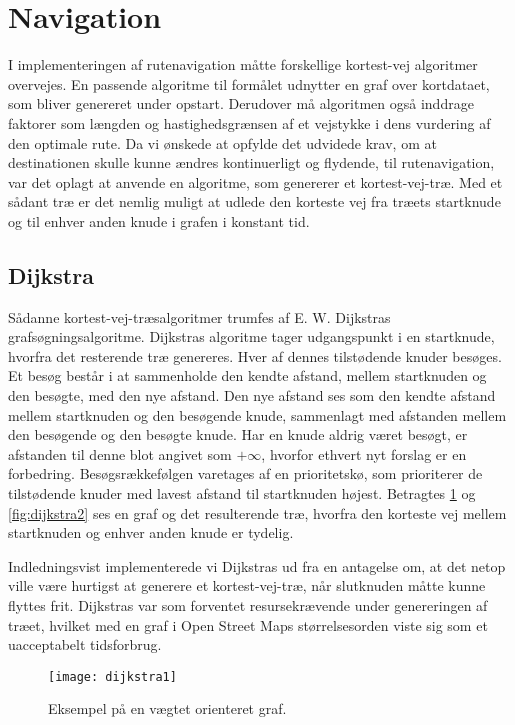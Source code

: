 \section{Navigation}
\label{sec:navigation}
I implementeringen af rutenavigation måtte forskellige kortest-vej algoritmer overvejes. En passende algoritme til formålet udnytter en graf over kortdataet, som bliver genereret under opstart. Derudover må algoritmen også inddrage faktorer som længden og hastighedsgrænsen af et vejstykke i dens vurdering af den optimale rute. Da vi ønskede at opfylde det udvidede krav, om at destinationen skulle kunne ændres kontinuerligt og flydende, til rutenavigation, var det oplagt at anvende en algoritme, som genererer et kortest-vej-træ. Med et sådant træ er det nemlig muligt at udlede den korteste vej fra træets startknude og til enhver anden knude i grafen i konstant tid.

\subsection{Dijkstra}
\label{subsec:dijkstra}
Sådanne kortest-vej-træsalgoritmer trumfes af E. W. Dijkstras grafsøgningsalgoritme. Dijkstras algoritme tager udgangspunkt i en startknude, hvorfra det resterende træ genereres. Hver af dennes tilstødende knuder besøges. Et besøg består i at sammenholde den kendte afstand, mellem startknuden og den besøgte, med den nye afstand. Den nye afstand ses som den kendte afstand mellem startknuden og den besøgende knude, sammenlagt med afstanden mellem den besøgende og den besøgte knude. Har en knude aldrig været besøgt, er afstanden til denne blot angivet som $+\infty$, hvorfor ethvert nyt forslag er en forbedring. Besøgsrækkefølgen varetages af en prioritetskø, som prioriterer de tilstødende knuder med lavest afstand til startknuden højest. Betragtes \ref{fig:dijkstra1} og \ref{fig:dijkstra2} ses en graf og det resulterende træ, hvorfra den korteste vej mellem startknuden og enhver anden knude er tydelig.

Indledningsvist implementerede vi Dijkstras ud fra en antagelse om, at det netop ville være hurtigst at generere et kortest-vej-træ, når slutknuden måtte kunne flyttes frit. Dijkstras var som forventet resursekrævende under genereringen af træet, hvilket med en graf i Open Street Maps størrelsesorden viste sig som et uacceptabelt tidsforbrug.

\begin{figure}[ht]
	\centering
  \texttt{[image: dijkstra1]}
  \captionsetup{width=0.8\textwidth}
  \caption{Eksempel på en vægtet orienteret graf.}
  \label{fig:dijkstra1}
\end{figure}

